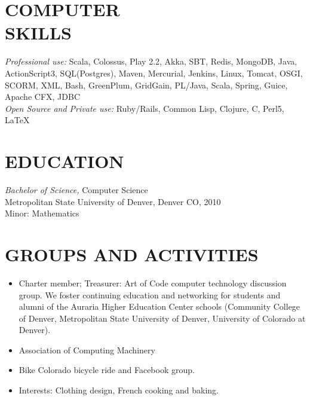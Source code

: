 \documentclass[line,margin]{res}
\begin{document}
\begin{resume}
 \section{COMPUTER \\ SKILLS} {\sl Professional use:} Scala, Colossus, Play 2.2, Akka, SBT, Redis, MongoDB, Java, ActionScript3, SQL(Postgres), Maven, Mercurial, Jenkins, Linux, Tomcat, OSGI, SCORM, XML, Bash, GreenPlum, GridGain, PL/Java, Scala, Spring, Guice, Apache CFX, JDBC  \\
                {\sl Open Source and Private use:} Ruby/Rails, Common Lisp, Clojure, C, Perl5, \LaTeX \\

\section{EDUCATION} {\sl Bachelor of Science,} Computer Science \\
               Metropolitan State University of Denver, Denver CO, 2010 \\
               Minor: Mathematics

\section{GROUPS AND ACTIVITIES}        
\begin{itemize}   %
          \item Charter member; Treasurer: Art of Code computer technology discussion group. We foster continuing education and networking for students and alumni of the Auraria Higher Education Center schools (Community College of Denver, Metropolitan State University of Denver, University of Colorado at Denver).
\item	Association of Computing Machinery
\item Bike Colorado bicycle ride and Facebook group.
\item Interests: Clothing design, French cooking and baking.
\end{itemize}
 

\end{resume}
\end{document}

